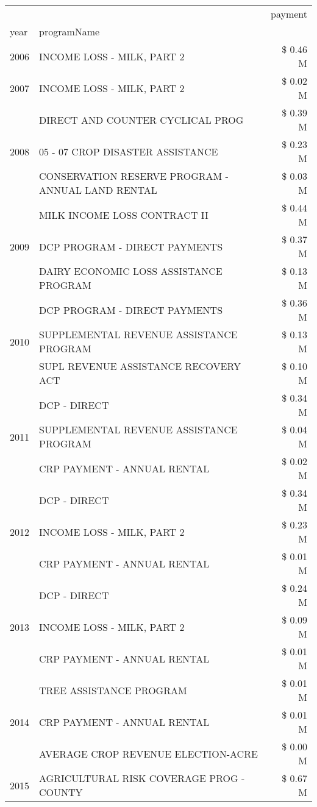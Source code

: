 \begin{tabular}{llr}
\toprule
 &  & payment \\
year & programName &  \\
\midrule
2006 & INCOME LOSS - MILK, PART 2 & \$ 0.46 M \\
\cline{1-3}
2007 & INCOME LOSS - MILK, PART 2 & \$ 0.02 M \\
\cline{1-3}
\multirow[t]{3}{*}{2008} & DIRECT AND COUNTER CYCLICAL PROG & \$ 0.39 M \\
 & 05 - 07 CROP DISASTER ASSISTANCE & \$ 0.23 M \\
 & CONSERVATION RESERVE PROGRAM - ANNUAL LAND RENTAL & \$ 0.03 M \\
\cline{1-3}
\multirow[t]{3}{*}{2009} & MILK INCOME LOSS CONTRACT II & \$ 0.44 M \\
 & DCP PROGRAM - DIRECT PAYMENTS & \$ 0.37 M \\
 & DAIRY ECONOMIC LOSS ASSISTANCE PROGRAM & \$ 0.13 M \\
\cline{1-3}
\multirow[t]{3}{*}{2010} & DCP PROGRAM - DIRECT PAYMENTS & \$ 0.36 M \\
 & SUPPLEMENTAL REVENUE ASSISTANCE PROGRAM & \$ 0.13 M \\
 & SUPL REVENUE ASSISTANCE RECOVERY ACT & \$ 0.10 M \\
\cline{1-3}
\multirow[t]{3}{*}{2011} & DCP - DIRECT & \$ 0.34 M \\
 & SUPPLEMENTAL REVENUE ASSISTANCE PROGRAM & \$ 0.04 M \\
 & CRP PAYMENT - ANNUAL RENTAL & \$ 0.02 M \\
\cline{1-3}
\multirow[t]{3}{*}{2012} & DCP - DIRECT & \$ 0.34 M \\
 & INCOME LOSS - MILK, PART 2 & \$ 0.23 M \\
 & CRP PAYMENT - ANNUAL RENTAL & \$ 0.01 M \\
\cline{1-3}
\multirow[t]{3}{*}{2013} & DCP - DIRECT & \$ 0.24 M \\
 & INCOME LOSS - MILK, PART 2 & \$ 0.09 M \\
 & CRP PAYMENT - ANNUAL RENTAL & \$ 0.01 M \\
\cline{1-3}
\multirow[t]{3}{*}{2014} & TREE ASSISTANCE PROGRAM & \$ 0.01 M \\
 & CRP PAYMENT - ANNUAL RENTAL & \$ 0.01 M \\
 & AVERAGE CROP REVENUE ELECTION-ACRE & \$ 0.00 M \\
\cline{1-3}
\multirow[t]{3}{*}{2015} & AGRICULTURAL RISK COVERAGE PROG - COUNTY & \$ 0.67 M \\

\end{tabular}
